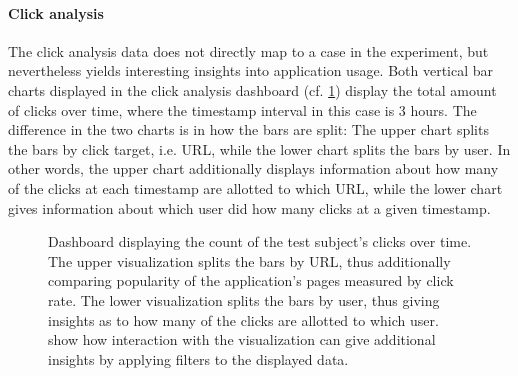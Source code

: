 \paragraph{Click analysis}

The click analysis data does not directly map to a case in the experiment, but nevertheless yields interesting insights into application usage.
Both vertical bar charts displayed in the click analysis dashboard (cf. \cref{figure:evaluation:user:dashboard-clicks}) display the total amount of clicks over time, where the timestamp interval in this case is 3 hours.
The difference in the two charts is in how the bars are split:
The upper chart splits the bars by click target, i.e. URL, while the lower chart splits the bars by user.
In other words, the upper chart additionally displays information about how many of the clicks at each timestamp are allotted to which URL, while the lower chart gives information about which user did how many clicks at a given timestamp.

\begin{figure}[ht]
        \caption[Dashboard displaying the count of the test subject's clicks over time.]{
        Dashboard displaying the count of the test subject's clicks over time.
        The upper visualization splits the bars by URL, thus additionally comparing popularity of the application's pages measured by click rate.
        The lower visualization splits the bars by user, thus giving insights as to how many of the clicks are allotted to which user.
         show how interaction with the visualization can give additional insights by applying filters to the displayed data.
        }
        \label{figure:evaluation:user:dashboard-clicks}
\end{figure}


